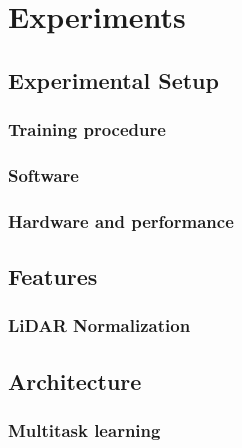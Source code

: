 \chapter{Experiments}%
\label{sec:experiments}

\section{Experimental Setup}
\subsection{Training procedure}
\subsection{Software}
\subsection{Hardware and performance}

\section{Features}


\subsection{LiDAR Normalization}%
\label{sec:normalization-experiment}


\section{Architecture}
\subsection{Multitask learning}\label{sec:multitask-experiments}

